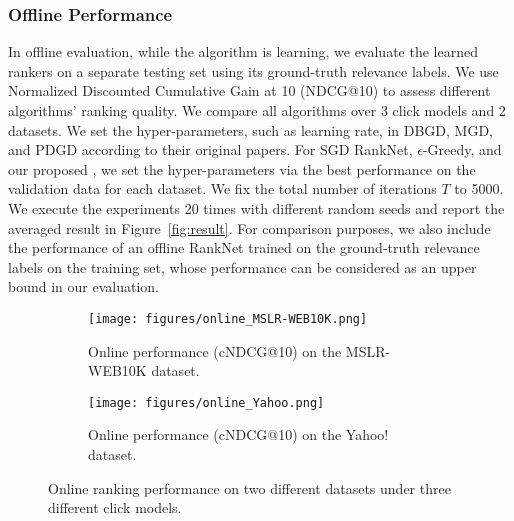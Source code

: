 \subsubsection{Offline Performance}
In offline evaluation, while the algorithm is learning, we evaluate the learned rankers on a separate testing set using its ground-truth relevance labels. We use Normalized Discounted Cumulative Gain at 10 (NDCG@10) to assess different algorithms' ranking quality. We compare all algorithms over 3 click models and 2 datasets. We set the hyper-parameters, such as learning rate, in DBGD, MGD, and PDGD according to their original papers. For SGD RankNet, $\epsilon$-Greedy, and our proposed \model{}, we set the hyper-parameters via the best performance on the validation data for each dataset. 
We fix the total number of iterations $T$ to 5000. We execute the experiments
20 times with different random seeds and report the averaged result in Figure~\ref{fig:result}. For comparison purposes, we also include the performance of an offline RankNet trained on the ground-truth relevance labels on the training set, whose performance can be considered as an upper bound in our evaluation.

\begin{figure*}[t]
  \centering
  \begin{subfigure}[b]{\textwidth}
    \centering
    \texttt{[image: figures/online\_MSLR-WEB10K.png]}
    \vspace{-4mm}
    \caption{Online performance (cNDCG@10) on the MSLR-WEB10K dataset.}
    \label{fig:online_WEB10K}
  \end{subfigure}
  \begin{subfigure}[b]{\textwidth}
    \centering
    \texttt{[image: figures/online\_Yahoo.png]}
    \vspace{-4mm}
    \caption{Online performance (cNDCG@10) on the Yahoo! dataset.}
    \label{fig:online_Yahoo}
  \end{subfigure}
  \vspace{-6mm}
  \caption{Online ranking performance on two different datasets under three different click models.}
  \label{fig:online}
  \vspace{-2mm}
\end{figure*}

